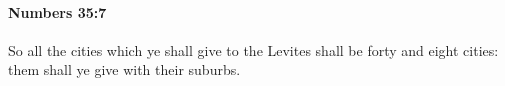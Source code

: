 
		\paragraph{Numbers 35:7} %
			\label{NUMBERS-35-7}

			So all the cities which ye shall give to the Levites shall be forty and eight cities: them shall ye give with their suburbs.


